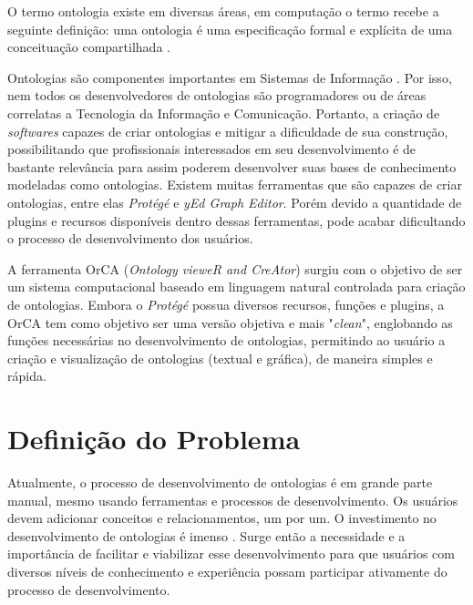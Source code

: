 \documentclass{bcc}
\begin{document}
O termo ontologia existe em diversas áreas, em computação o termo recebe a seguinte definição: uma ontologia é uma especificação formal e explícita de uma conceituação compartilhada \cite{gruber1995}.

Ontologias são componentes importantes em Sistemas de Informação \cite{estival2004}. Por isso, nem todos os desenvolvedores de ontologias são programadores ou de áreas correlatas a Tecnologia da Informação e Comunicação. Portanto, a criação de \textit{softwares} capazes de criar ontologias e mitigar a dificuldade de sua construção, possibilitando que profissionais interessados em seu desenvolvimento é de bastante relevância para assim poderem desenvolver suas bases de conhecimento modeladas como ontologias. Existem muitas ferramentas que são capazes de criar ontologias, entre elas \textit{Protégé} \cite{noy2001} e \textit{yEd Graph Editor}. Porém devido a quantidade de plugins e recursos disponíveis dentro dessas ferramentas, pode acabar dificultando o processo de desenvolvimento dos usuários.

A ferramenta OrCA (\textit{Ontology vieweR and CreAtor}) surgiu com o objetivo de ser um sistema computacional baseado em linguagem natural controlada para criação de ontologias. Embora o \textit{Protégé} possua diversos recursos, funções e plugins, a OrCA tem como objetivo ser uma versão objetiva e mais "\textit{clean}", englobando as funções necessárias no desenvolvimento de ontologias, permitindo ao usuário a criação e visualização de ontologias (textual e gráfica), de maneira simples e rápida.


\section{Definição do Problema}

Atualmente, o processo de desenvolvimento de ontologias é em grande parte manual, mesmo usando ferramentas e processos de desenvolvimento. Os usuários devem adicionar conceitos e relacionamentos, um por um. O investimento no desenvolvimento de ontologias é imenso \cite{liu2011}. Surge então a necessidade e a importância de facilitar e viabilizar esse desenvolvimento para que usuários com diversos níveis de conhecimento e experiência possam participar ativamente do processo de desenvolvimento.
\end{document}
